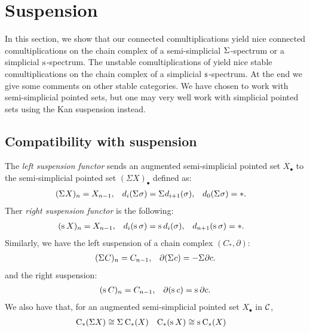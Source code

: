 
\section{Suspension}\label{s:suspension}


In this section, we show that our connected comultiplications yield nice connected comultiplications on the chain complex of a semi-simplicial $\Sigma^{}$-spectrum or a simplicial $\operatorname{s}^{}$-spectrum. The unstable comultiplications of \cite{medina2021may_st} yield nice stable comultiplications on the chain complex of a simplicial $\operatorname{s}^{}$-spectrum. At the end we give some comments on other stable categories. We have chosen to work with semi-simplicial pointed sets, but one may very well work with simplicial pointed sets using the Kan suspension instead.


\subsection{Compatibility with suspension} The \emph{left suspension functor} sends an augmented semi-simplicial pointed set $X_\bullet$ to the semi-simplicial pointed set $(\Sigma X)_\bullet$ defined as:
\begin{align*}
    (\Sigma^{} X)_n &= X_{n-1},& d_i(\Sigma^{}\sigma) &= \Sigma^{} d_{i+1}(\sigma),& d_{0}(\Sigma^{}\sigma) &= *.
\end{align*}
Ther \emph{right suspension functor} is the following:
\begin{align*}
    (\operatorname{s}^{} X)_n &= X_{n-1}, &d_i(\operatorname{s}^{}\sigma) &= \operatorname{s}^{} d_i(\sigma),& d_{n+1}(\operatorname{s}^{} \sigma) &= *.
\end{align*}
Similarly, we have the left suspension of a chain complex $(C_*,\partial)$:
\begin{align*}
    (\Sigma^{} C)_n &= C_{n-1}, & \partial (\Sigma^{} c) = -\Sigma^{} \partial c.
\end{align*}
and the right suspension:
\begin{align*}
    (\operatorname{s}^{} C)_n &= C_{n-1}, & \partial (\operatorname{s}^{} c) = \operatorname{s}^{} \partial c.
\end{align*}
We also have that, for an augmented semi-simplicial pointed set $X_\bullet$ in $\mathcal{C}$,
\begin{align*}
    \operatorname{C}_*(\Sigma X)&\cong \Sigma^{} \operatorname{C}_*(X) & \operatorname{C}_*(\operatorname{s}^{}X) &\cong \operatorname{s}^{}\operatorname{C}_*(X)
\end{align*}

